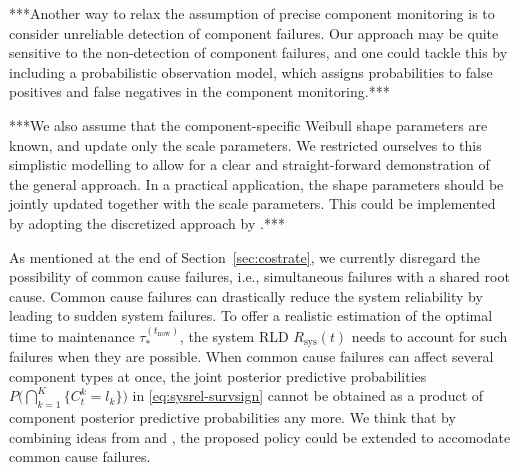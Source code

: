 \documentclass[authoryear]{elsarticle}
\newcommand{\Rsys}{R_\text{sys}}
\def\tnow{t_\text{now}}
\newcommand{\tausnow}{\tau_*^{(\tnow)}}
\begin{document}
***Another way to relax the assumption of precise component monitoring
is to consider unreliable detection of component failures.
Our approach may be quite sensitive to the non-detection of component failures,
and one could tackle this by including a probabilistic observation model,
which assigns probabilities to false positives and false negatives in the component monitoring.***

***We also assume that the component-specific Weibull shape parameters are known,
and update only the scale parameters.
We restricted ourselves to this simplistic modelling
to allow for a clear and straight-forward demonstration of the general approach.
In a practical application, the shape parameters should be jointly updated together with the scale parameters.
This could be implemented by adopting the discretized approach by \cite{1969:soland}.***

As mentioned at the end of Section~\ref{sec:costrate},
we currently disregard the possibility of common cause failures,
i.e., simultaneous failures with a shared root cause.
Common cause failures can drastically reduce the system reliability
by leading to sudden system failures.
To offer a realistic estimation of the optimal time to maintenance $\tausnow$,
the system RLD $\Rsys(t)$ needs to account for such failures when they are possible.
When common cause failures can affect several component types at once,
the joint posterior predictive probabilities $P\Big( \bigcap_{k=1}^K \{ C^k_t = l_k\} \Big)$ in \eqref{eq:sysrel-survsign}
cannot be obtained as a product of component posterior predictive probabilities any more.
We think that by combining ideas from \cite{2015:coolen-coolen-maturi} and \cite{Troffaes2014a},
the proposed policy could be extended to accomodate common cause failures.
\end{document}
